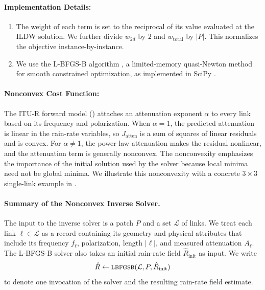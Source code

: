 \documentclass[a4paper,fleqn]{cas-sc}
\DeclareRobustCommand{\LBFGSB}{\textsc{lbfgsb}}
\begin{document}
\paragraph{Implementation Details:}
\begin{enumerate}
  \item
        The weight of each term is set to the reciprocal of its value evaluated at the ILDW solution.
        We further divide $w_{2d}$ by $2$ and $w_{\mathrm{total}}$ by $|P|$.
        This normalizes the objective instance-by-instance.
  \item
        We use the L-BFGS-B algorithm \citep{byrd1995limited,zhu1997algorithm}, a limited-memory quasi-Newton method for smooth constrained optimization, as implemented in SciPy \citep{scipy}.
\end{enumerate}

\paragraph{Nonconvex Cost Function:}
The ITU-R forward model () attaches an attenuation exponent $\alpha$ to every link based on its frequency and polarization.
When $\alpha=1$, the predicted attenuation is linear in the rain-rate variables, so
$J_{\mathrm{atten}}$ is a sum of squares of linear residuals and is convex.
For $\alpha\neq 1$, the power-law attenuation makes the residual nonlinear,
and the attenuation term is generally nonconvex.
The nonconvexity emphasizes the importance of the initial solution used by the solver because local minima need not be global minima. We illustrate this nonconvexity with a concrete $3\times3$ single-link example in .

\paragraph{Summary of the Nonconvex Inverse Solver.}
The input to the inverse solver is a patch $P$ and a set $\mathcal{L}$ of links.
We treat each link $\ell\in\mathcal{L}$ as a record containing its geometry and physical attributes that include its frequency $f_\ell$, polarization, length $|\ell|$, and measured attenuation $A_\ell$.
The L-BFGS-B solver also takes an initial rain-rate field $\hat{R}_{\mathrm{init}}$ as input.
We write
\[
  \hat{R}\gets \LBFGSB(\mathcal{L},P,\hat{R}_{\mathrm{init}})
\]
to denote one invocation of the solver and the resulting rain-rate field estimate.

\end{document}
